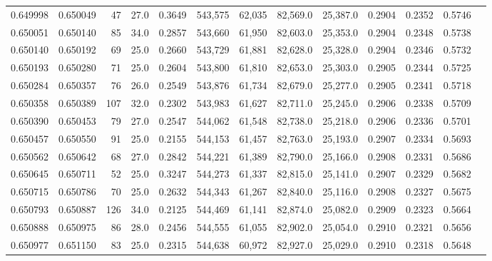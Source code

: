 \begin{tabular}{rrrrrrrrrrrrr}
0.649998 & 0.650049 &    47 & 27.0 &                                     0.3649 & 543,575 &  62,035 &  82,569.0 &  25,387.0 & 0.2904 & 0.2352 & 0.5746 \\
0.650051 & 0.650140 &    85 & 34.0 &                                     0.2857 & 543,660 &  61,950 &  82,603.0 &  25,353.0 & 0.2904 & 0.2348 & 0.5738 \\
0.650140 & 0.650192 &    69 & 25.0 &                                     0.2660 & 543,729 &  61,881 &  82,628.0 &  25,328.0 & 0.2904 & 0.2346 & 0.5732 \\
0.650193 & 0.650280 &    71 & 25.0 &                                     0.2604 & 543,800 &  61,810 &  82,653.0 &  25,303.0 & 0.2905 & 0.2344 & 0.5725 \\
0.650284 & 0.650357 &    76 & 26.0 &                                     0.2549 & 543,876 &  61,734 &  82,679.0 &  25,277.0 & 0.2905 & 0.2341 & 0.5718 \\
0.650358 & 0.650389 &   107 & 32.0 &                                     0.2302 & 543,983 &  61,627 &  82,711.0 &  25,245.0 & 0.2906 & 0.2338 & 0.5709 \\
0.650390 & 0.650453 &    79 & 27.0 &                                     0.2547 & 544,062 &  61,548 &  82,738.0 &  25,218.0 & 0.2906 & 0.2336 & 0.5701 \\
0.650457 & 0.650550 &    91 & 25.0 &                                     0.2155 & 544,153 &  61,457 &  82,763.0 &  25,193.0 & 0.2907 & 0.2334 & 0.5693 \\
0.650562 & 0.650642 &    68 & 27.0 &                                     0.2842 & 544,221 &  61,389 &  82,790.0 &  25,166.0 & 0.2908 & 0.2331 & 0.5686 \\
0.650645 & 0.650711 &    52 & 25.0 &                                     0.3247 & 544,273 &  61,337 &  82,815.0 &  25,141.0 & 0.2907 & 0.2329 & 0.5682 \\
0.650715 & 0.650786 &    70 & 25.0 &                                     0.2632 & 544,343 &  61,267 &  82,840.0 &  25,116.0 & 0.2908 & 0.2327 & 0.5675 \\
0.650793 & 0.650887 &   126 & 34.0 &                                     0.2125 & 544,469 &  61,141 &  82,874.0 &  25,082.0 & 0.2909 & 0.2323 & 0.5664 \\
0.650888 & 0.650975 &    86 & 28.0 &                                     0.2456 & 544,555 &  61,055 &  82,902.0 &  25,054.0 & 0.2910 & 0.2321 & 0.5656 \\
0.650977 & 0.651150 &    83 & 25.0 &                                     0.2315 & 544,638 &  60,972 &  82,927.0 &  25,029.0 & 0.2910 & 0.2318 & 0.5648 \\

\end{tabular}
